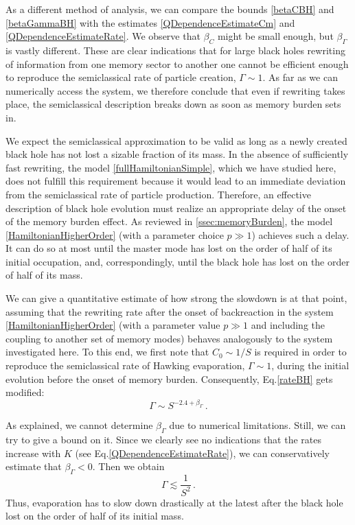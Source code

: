 \documentclass[aps,prd,reprint,superscriptaddress,nofootinbib]{revtex4-2}
\makeatletter
\newcommand*{\Eq}{Eq.\@\xspace}
\makeatother
\begin{document}
As a different method of analysis, we can compare the bounds \eqref{betaCBH} and \eqref{betaGammaBH} with the estimates \eqref{QDependenceEstimateCm} and \eqref{QDependenceEstimateRate}. We observe that $\beta_C$ might be small enough, but $\beta_\Gamma$ is vastly different.
 These are clear indications that for large black holes rewriting of information from one memory sector to another one cannot be efficient enough to reproduce the semiclassical rate of particle creation, $\Gamma \sim 1$. 
As far as we can numerically access the system, we therefore conclude that even if rewriting takes place, the semiclassical description breaks down as soon as memory burden sets in.

We expect the semiclassical approximation to be valid as long as a newly created black hole has not lost a sizable fraction of its mass. In the absence of sufficiently fast rewriting, the model \eqref{fullHamiltonianSimple}, which we have studied here, does not fulfill this requirement because it would lead to an immediate deviation from the semiclassical rate of 
particle production.
Therefore, an effective description of black hole evolution must realize an appropriate delay of the onset of the memory burden effect. As reviewed in \ref{ssec:memoryBurden}, the model \eqref{HamiltonianHigherOrder} (with a parameter choice $p \gg 1$) achieves such a delay. It can do so at most until the master mode has lost on the order of half of its initial occupation, and, correspondingly, until the black hole has lost on the order of half of its mass.

We can give a quantitative estimate of how strong the slowdown is at that 
point, assuming that the rewriting rate after the onset of backreaction in the system \eqref{HamiltonianHigherOrder} (with a parameter value $p \gg 1$ and including the coupling to another set of memory modes) behaves analogously to the system investigated here.
To this end, we first note that $C_0\sim 1/S$ is required in order to reproduce the semiclassical rate of Hawking evaporation, $\Gamma \sim 1$, during the initial evolution before the onset of memory burden.
Consequently, \Eq \eqref{rateBH} gets modified:
\begin{equation} \label{rateBH2} 
\Gamma \sim S^{-2.4 + \beta_\Gamma} \,.
\end{equation}


As explained, we cannot determine $\beta_\Gamma$ due to numerical limitations. Still, we can try to give a bound on it. Since we clearly see no indications that the rates increase with $K$ (see \Eq \eqref{QDependenceEstimateRate}), we can conservatively estimate that $\beta_\Gamma<0$. Then we obtain 
\begin{equation}  \label{suppressedRate}
\Gamma \lesssim \frac{1}{S^2} \,.
\end{equation}
Thus, evaporation has to slow down drastically at the latest after the black hole lost on the order of half of its initial mass.
\end{document}
